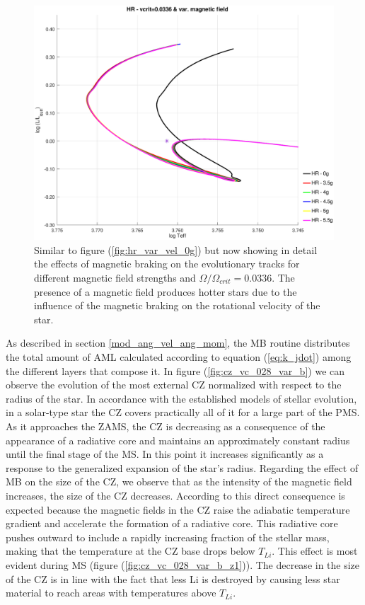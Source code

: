 \documentclass[fleqn,usenatbib]{mnras}
\begin{document}
\begin{figure}
	\includegraphics[trim = 30mm 15mm 15mm 15mm, clip,width=\columnwidth]{figures/hr_vc_0336_var_g_z1.eps}
    \caption{Similar to figure (\ref{fig:hr_var_vel_0g}) but now showing in detail the effects of magnetic braking on the evolutionary tracks for different magnetic field strengths and $\Omega / \Omega_{crit}=0.0336$. The presence of a magnetic field produces hotter stars due to the influence of the magnetic braking on the rotational velocity of the star.}
    \label{hr_vc_0336_var_g_z1}
\end{figure}



As described in section \ref{mod_ang_vel_ang_mom}, the MB routine distributes the total amount of AML calculated according to equation (\ref{eq:k_jdot}) among the different layers that compose it. In figure (\ref{fig:cz_vc_028_var_b}) we can observe the evolution of the most external CZ normalized with respect to the radius of the star. In accordance with the established models of stellar evolution, in a solar-type star the CZ covers practically all of it for a large part of the PMS. As it approaches the ZAMS, the CZ is decreasing as a consequence of the appearance of a radiative core and maintains an approximately constant radius until the final stage of the MS. In this point it increases significantly as a response to the generalized expansion of the star's radius. Regarding the effect of MB on the size of the CZ, we observe that as the intensity of the magnetic field increases, the size of the CZ decreases. According to \citet{Jeffries2004} this direct consequence is expected because the magnetic fields in the CZ raise the adiabatic temperature gradient and accelerate the formation of a radiative core. This radiative core pushes outward to include a rapidly increasing fraction of the stellar mass, making that the temperature at the CZ base drops below $T_{Li}$. This effect is most evident during MS (figure (\ref{fig:cz_vc_028_var_b_z1})). The decrease in the size of the CZ is in line with the fact that less Li is destroyed by causing less star material to reach areas with temperatures above $T_{Li}$.\par
\end{document}
